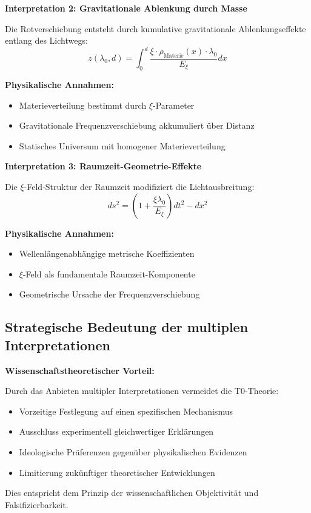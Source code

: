 \documentclass[12pt,a4paper]{article}
\newcommand{\xipar}{\xi}
\newcommand{\Exi}{E_\xi}
\begin{document}
	\begin{alternative}
		\textbf{Interpretation 2: Gravitationale Ablenkung durch Masse}
		
		Die Rotverschiebung entsteht durch kumulative gravitationale Ablenkungseffekte entlang des Lichtwegs:
		\begin{equation}
			z(\lambda_0, d) = \int_0^d \frac{\xipar \cdot \rho_{\text{Materie}}(x) \cdot \lambda_0}{\Exi} dx
		\end{equation}
		
		\textbf{Physikalische Annahmen:}
		\begin{itemize}
			\item Materieverteilung bestimmt durch $\xi$-Parameter
			\item Gravitationale Frequenzverschiebung akkumuliert über Distanz
			\item Statisches Universum mit homogener Materieverteilung
		\end{itemize}
	\end{alternative}
	
	\begin{alternative}
		\textbf{Interpretation 3: Raumzeit-Geometrie-Effekte}
		
		Die $\xi$-Feld-Struktur der Raumzeit modifiziert die Lichtausbreitung:
		\begin{equation}
			ds^2 = \left(1 + \frac{\xipar \lambda_0}{\Exi}\right) dt^2 - dx^2
		\end{equation}
		
		\textbf{Physikalische Annahmen:}
		\begin{itemize}
			\item Wellenlängenabhängige metrische Koeffizienten
			\item $\xi$-Feld als fundamentale Raumzeit-Komponente
			\item Geometrische Ursache der Frequenzverschiebung
		\end{itemize}
	\end{alternative}
	
	
	\subsection{Strategische Bedeutung der multiplen Interpretationen}
	
	\begin{warning}
		\textbf{Wissenschaftstheoretischer Vorteil:}
		
		Durch das Anbieten multipler Interpretationen vermeidet die T0-Theorie:
		\begin{itemize}
			\item Vorzeitige Festlegung auf einen spezifischen Mechanismus
			\item Ausschluss experimentell gleichwertiger Erklärungen
			\item Ideologische Präferenzen gegenüber physikalischen Evidenzen
			\item Limitierung zukünftiger theoretischer Entwicklungen
		\end{itemize}
		
		Dies entspricht dem Prinzip der wissenschaftlichen Objektivität und Falsifizierbarkeit.
	\end{warning}	
\end{document}
